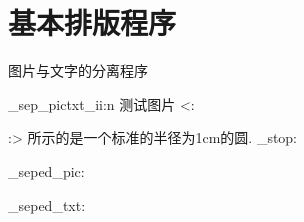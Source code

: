 \documentclass[a4paper,fontset = windowsnew]{ctexbook}
\begin{document}
\chapter{基本排版程序}

\ExplSyntaxOn

\parindent=0pt

图片与文字的分离程序

\cexam_sep_pictxt_ii:n 
测试图片
<:
:>
所示的是一个标准的半径为1cm的圆.
\scan_stop:


\par
\cexam_seped_pic:

\par
\cexam_seped_txt:
\end{document}
